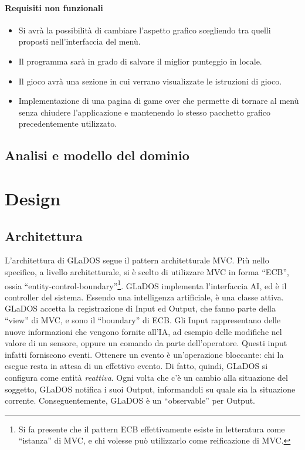 \documentclass[a4paper,12pt]{report}
\begin{document}
\subsubsection{Requisiti non funzionali}
\begin{itemize}
    \item Si avrà la possibilità di cambiare l'aspetto grafico scegliendo tra quelli proposti nell'interfaccia del menù.
    \item Il programma sarà in grado di salvare il miglior punteggio in locale.
    \item Il gioco avrà una sezione in cui verrano visualizzate le istruzioni di gioco.
    \item Implementazione di una pagina di game over che permette di tornare al menù senza chiudere l'applicazione e 
        mantenendo lo stesso pacchetto grafico precedentemente utilizzato.
\end{itemize}
\section{Analisi e modello del dominio}


\chapter{Design}

\section{Architettura}

L'architettura di GLaDOS segue il pattern architetturale MVC.
%
Più nello specifico, a livello architetturale, si è scelto di utilizzare MVC in forma ``ECB'', ossia ``entity-control-boundary''\footnote{
Si fa presente che il pattern ECB effettivamente esiste in letteratura come ``istanza'' di MVC, e chi volesse può utilizzarlo come reificazione di MVC.
}.
%
GLaDOS implementa l'interfaccia AI, ed è il controller del sistema.
Essendo una intelligenza artificiale, è una classe attiva.
%
GLaDOS accetta la registrazione di Input ed Output, che fanno parte della ``view'' di MVC, e sono il ``boundary'' di ECB.
Gli Input rappresentano delle nuove informazioni che vengono fornite all'IA, ad esempio delle modifiche nel valore di un sensore, oppure un comando da parte dell'operatore.
Questi input infatti forniscono eventi.
Ottenere un evento è un'operazione bloccante: chi la esegue resta in attesa di un effettivo evento.
Di fatto, quindi, GLaDOS si configura come entità \textit{reattiva}.
Ogni volta che c'è un cambio alla situazione del soggetto, GLaDOS notifica i suoi Output,
informandoli su quale sia la situazione corrente.
%
Conseguentemente, GLaDOS è un ``observable'' per Output.
\end{document}
